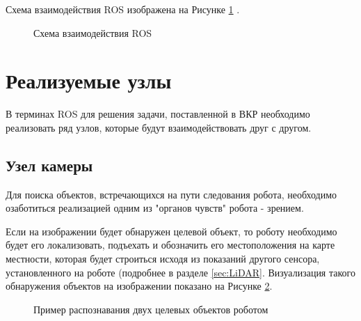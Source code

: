 \documentclass[12pt,a4paper]{scrartcl}
\begin{document}
				Схема взаимодействия ROS изображена на Рисунке \ref{fig:ROSScheme} .
				
				\begin{figure}[h]
					\caption{Схема взаимодействия ROS}
					\label{fig:ROSScheme}
				\end{figure}
				
		\section{Реализуемые узлы}
			В терминах ROS для решения задачи, поставленной в ВКР необходимо реализовать ряд узлов, которые будут взаимодействовать друг с другом.
			
			\subsection{Узел камеры}
			 	Для поиска объектов, встречающихся на пути следования робота, необходимо озаботиться реализацией одним из "органов чувств" робота - зрением. 
				
				Если на изображении будет обнаружен целевой объект, то роботу необходимо будет его локализовать, подъехать и обозначить его местоположения на карте местности, которая будет строиться исходя из показаний другого сенсора, установленного на роботе (подробнее в разделе \ref{sec:LiDAR}. Визуализация такого обнаружения объектов на изображении показано на Рисунке \ref{fig:ObjectDetectionExample}.
				
				\begin{figure}[h]
					\caption{Пример распознавания двух целевых объектов роботом}
					\label{fig:ObjectDetectionExample}
				\end{figure}
							 
\end{document}
